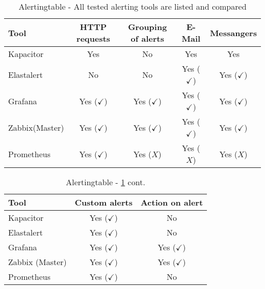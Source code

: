 \begin{table}
	\centering
	
	\begin{tabular}{lcccc}
		\hline
Tool & HTTP requests & Grouping of alerts & E-Mail & Messangers \\
\hline
Kapacitor & Yes  & No & Yes & Yes \\
Elastalert & No & No & Yes ($ \checkmark $) & Yes ($ \checkmark $) \\
Grafana & Yes ($ \checkmark $) & Yes ($ \checkmark $) & Yes ($ \checkmark $) & Yes ($ \checkmark $) \\
Zabbix(Master) & Yes ($ \checkmark $) & Yes ($ \checkmark $) & Yes ($ \checkmark $) & Yes ($ \checkmark $) \\
Prometheus & Yes ($ \checkmark $) & Yes ($ X $) & Yes ($ X $) & Yes ($ X $)\\
		\hline
	\end{tabular}
	\caption{Alertingtable - All tested alerting tools are listed and compared}
	\label{tab:Alerting}
\end{table}

\begin{table}
	\centering
	\begin{tabular}{lcc}
		\hline
		Tool & Custom alerts & Action on alert \\
		\hline
		Kapacitor                    & Yes ($ \checkmark $)       & No\\
		Elastalert                   & Yes ($ \checkmark $) & No\\
		Grafana                      & Yes ($ \checkmark $)          & Yes ($ \checkmark $)\\
		Zabbix (Master) & Yes ($ \checkmark $) & Yes ($ \checkmark $)\\
		Prometheus & Yes ($ \checkmark $) & No \\
		\hline 
	\end{tabular}
	\caption{Alertingtable - \cref{tab:Alerting} cont.}
	\label{tab:Alertingcont}
\end{table}